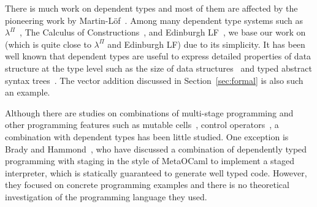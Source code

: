 





There is much work on dependent types and most of them are affected by
the pioneering work by Martin-L\"{o}f~\cite{martin1973intuitionistic}.
Among many dependent type systems such as
$\lambda^\Pi$~\cite{Meyer1986}, The Calculus of
Constructions~\cite{coquand:inria-00076024}, and Edinburgh
LF~\cite{harper1993framework}, we base our work on \LLF~\cite{attapl}
(which is quite close to $\lambda^\Pi$ and Edinburgh LF) due to its
simplicity.  It has been well known that dependent types are useful to
express detailed properties of data structure at the type level such
as the size of data structures~\cite{Xi98} and typed abstract syntax
trees~\cite{DBLP:conf/dsl/LeijenM99,DBLP:conf/popl/XiCC03}.  The
vector addition discussed in Section~\ref{sec:formal} is also such an
example.




Although there are studies on combinations of multi-stage programming and other programming features such as mutable cells~\cite{kiselyov2016refined},
control operators~\cite{KameyamaKiselyovShan09PEPM,oishi2017staging},
a combination with dependent types has been little studied.
One exception is Brady and Hammond~\cite{brady2006dependently},
who have discussed a
combination of dependently typed programming with staging in the
style of MetaOCaml to implement a staged interpreter, which is
statically guaranteed to generate well typed code.  However, they
focused on concrete programming examples and there is no theoretical investigation
of the programming language they used.


